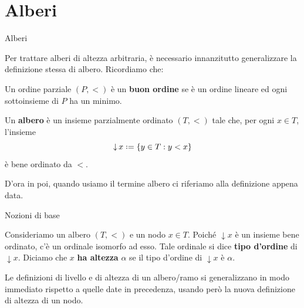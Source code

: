 \documentclass{beamer}
\theoremstyle{num.custom-title}
\theoremstyle{custom-title}
\DeclareMathOperator{\down}{\downarrow}
\newcommand*{\defeq}{\mathrel{\rlap{%
                     \raisebox{0.3ex}{$\cdot$}}%
                     \raisebox{-0.3ex}{$\cdot$}}%
                     =}
\renewcommand{\emph}[1]{\textbf{#1}}
\begin{document}
\section{Alberi}

\begin{frame}{Alberi}

Per trattare alberi di altezza arbitraria, è necessario innanzitutto generalizzare la definizione stessa di albero. Ricordiamo che:

\begin{definition}
Un ordine parziale $(P,<)$ è un \emph{buon ordine} se è un ordine lineare ed ogni sottoinsieme di $P$ ha un minimo.
\end{definition}

\pause

\begin{definition}
Un \emph{albero} è un insieme parzialmente ordinato $(T,<)$ tale che, per ogni $x \in T$, l'insieme
\[
\down x \defeq \{y \in T : y < x\}
\]
è bene ordinato da $<$.
\end{definition}

D'ora in poi, quando usiamo il termine albero ci riferiamo alla definizione appena data.

\end{frame}


\begin{frame}{Nozioni di base}

Consideriamo un albero $(T,<)$ e un nodo $x \in T$. Poiché $\down x$ è un insieme bene ordinato, c'è un ordinale isomorfo ad esso. Tale ordinale si dice \emph{tipo d'ordine} di $\down x$. Diciamo che $x$ \emph{ha altezza} $\alpha$ se il tipo d'ordine di $\down x$ è $\alpha$.

\pause

Le definizioni di livello e di altezza di un albero/ramo si generalizzano in modo immediato rispetto a quelle date in precedenza, usando però la nuova definizione di altezza di un nodo.

\end{frame}
\end{document}

